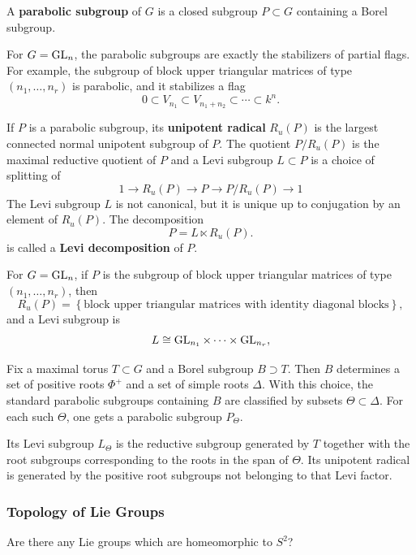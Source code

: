 \documentclass[12pt]{article}
\begin{document}
\begin{definition}
    A \textbf{parabolic subgroup} of $G$ is a closed subgroup $P\subset G$ containing a Borel subgroup.
\end{definition}


For $G=\operatorname{GL}_n$, the parabolic subgroups are exactly the stabilizers of partial flags. For example, the subgroup of block upper triangular matrices of type $(n_1,\dots,n_r)$ is parabolic, and it stabilizes a flag
\[
    0\subset V_{n_1}\subset V_{n_1+n_2}\subset \cdots \subset k^n.
\]

\begin{definition}
    If $P$ is a parabolic subgroup, its \textbf{unipotent radical} $R_u(P)$ is the largest connected normal unipotent subgroup of $P$. The quotient $P/R_u(P)$ is the maximal reductive quotient of $P$ and a Levi subgroup $L\subset P$ is a choice of splitting of
    \[1\to R_u(P)\to P\to P/R_u(P)\to 1\]
    The Levi subgroup $L$ is not canonical, but it is unique up to conjugation by an element of $R_u(P)$. The decomposition
    \[
        P=L\ltimes R_u(P).
    \]
    is called a \textbf{Levi decomposition} of $P$.
\end{definition}

For $G=\operatorname{GL}_n$, if $P$ is the subgroup of block upper triangular matrices of type $(n_1,\dots,n_r)$, then
\[
    R_u(P)=
    \left\{
    \text{block upper triangular matrices with identity diagonal blocks}
    \right\},
\]
and a Levi subgroup is
\[
    L\cong \operatorname{GL}_{n_1}\times \cdots \times \operatorname{GL}_{n_r},
\]

Fix a maximal torus $T\subset G$ and a Borel subgroup $B\supset T$. Then $B$ determines a set of positive roots $\Phi^+$ and a set of simple roots $\Delta$. With this choice, the standard parabolic subgroups containing $B$ are classified by subsets $\Theta\subset \Delta$. For each such $\Theta$, one gets a parabolic subgroup $P_\Theta$.

Its Levi subgroup $L_\Theta$ is the reductive subgroup generated by $T$ together with the root subgroups corresponding to the roots in the span of $\Theta$. Its unipotent radical is generated by the positive root subgroups not belonging to that Levi factor.
\subsubsection{Topology of Lie Groups}

\begin{exercise}
    Are there any Lie groups which are homeomorphic to $S^2$?
\end{exercise}
\end{document}
